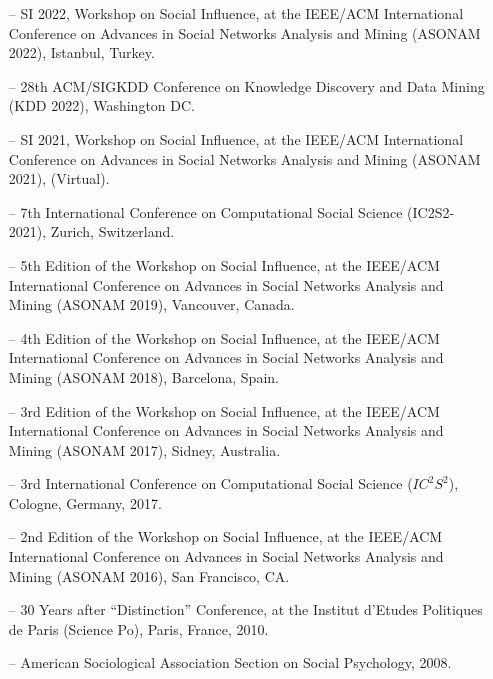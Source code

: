 \begin{itemize}[itemsep=-0.5ex]
    \item[--] SI 2022, Workshop on Social Influence, at the IEEE/ACM International Conference on Advances in Social Networks Analysis and Mining (ASONAM 2022), Istanbul, Turkey.
    \item[--] 28th ACM/SIGKDD Conference on Knowledge Discovery and Data Mining (KDD 2022), Washington DC.
    \item[--] SI 2021, Workshop on Social Influence, at the IEEE/ACM International Conference on Advances in Social Networks Analysis and Mining (ASONAM 2021), (Virtual).
    \item[--] 7th International Conference on Computational Social Science (IC2S2-2021), Zurich, Switzerland.
    \item[--] 5th Edition of the Workshop on Social Influence, at the IEEE/ACM International Conference on Advances in Social Networks Analysis and Mining (ASONAM 2019), Vancouver, Canada. 
    \item[--] 4th Edition of the Workshop on Social Influence, at the IEEE/ACM International Conference on Advances in Social Networks Analysis and Mining (ASONAM 2018), Barcelona, Spain. 
    \item[--] 3rd Edition of the Workshop on Social Influence, at the IEEE/ACM International Conference on Advances in Social Networks Analysis and Mining (ASONAM 2017), Sidney, Australia. 
    \item[--] 3rd International Conference on Computational Social Science ($IC^2S^2$), Cologne, Germany, 2017. 
    \item[--] 2nd Edition of the Workshop on Social Influence, at the IEEE/ACM International Conference on Advances in Social Networks Analysis and Mining (ASONAM 2016), San Francisco, CA. 
    \item[--] 30 Years after ``Distinction'' Conference, at the Institut d'Etudes Politiques de Paris (Science Po), Paris, France, 2010.
    \item[--] American Sociological Association Section on Social Psychology, 2008.
\end{itemize}